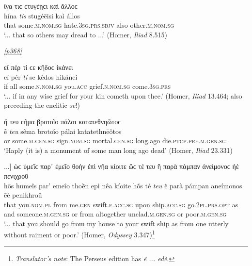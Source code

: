 \begin{exe}
\ex ἵνα τιϲ ϲτυγέῃϲι καὶ ἄλλοϲ\\
\gll hína \emph{tis} stugéēisi kaì állos\\
that some.\textsc{m.nom.sg} hate.\textsc{3sg.prs.sbjv} also other.\textsc{m.nom.sg}\\
\trans `... that so others may dread to ...' (Homer, \textit{Iliad} 8.515)
\label{tis2}
\end{exe}

\hyperlink{p368}{\emph{[p368]}}

\begin{exe}
\ex εἴ πέρ τί ϲε κῆδοϲ ἱκάνει\\
\gll eí pér \emph{tí} se kêdos hikánei\\
if all some.\textsc{n.nom.sg} you.\textsc{acc} grief.\textsc{n.nom.sg}
come.\textsc{3sg.prs}\\
\trans `... if in any wise grief for your kin cometh upon thee.' (Homer, \textit{Iliad} 13.464; also preceding the enclitic \textit{se}!)
\label{tis3}
\end{exe}

\begin{exe}
\ex ἤ τευ ϲῆμα βροτοῖο πάλαι κατατεθνηῶτοϲ\\
\gll ḗ \emph{teu} sêma brotoîo pálai katatethnēôtos\\
or some.\textsc{m.gen.sg} sign.\textsc{nom.sg} mortal.\textsc{gen.sg} long.ago die.\textsc{ptcp.prf.m.gen.sg}\\
\trans `Haply (it is) a monument of some man long ago dead' (Homer, \textit{Iliad} 23.331)
\label{tis4}
\end{exe}

\begin{exe}
\ex {[}...{]} ὡϲ ὑμεῖϲ παρ᾽ ἐμεῖο θοὴν ἐπὶ νῆα κίοιτε ὥϲ τέ τευ ἢ παρὰ πάμπαν ἀνείμονοϲ ἠὲ πενιχροῦ\\
\gll hōs humeîs par' emeîo thoḕn epì nêa kíoite hṓs té \emph{teu} ḕ parà pámpan aneímonos ēè penikhroû\\
that you.\textsc{nom.pl} from me.\textsc{gen} swift.\textsc{f.acc.sg} upon ship.\textsc{acc.sg} go.\textsc{2pl.prs.opt} as and someone.\textsc{m.gen.sg} or from altogether unclad.\textsc{m.gen.sg} or poor.\textsc{m.gen.sg}\\
\trans `... that you should go from my house to your swift ship as from one utterly without raiment or poor.' (Homer, \textit{Odyssey} 3.347)\footnote{\emph{Translator's note}: The Perseus edition
has \textit{ê ... ēdè}.}
\label{tis5}
\end{exe}


